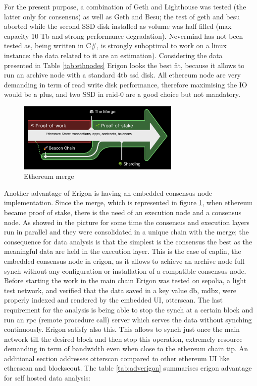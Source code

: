 \documentclass[11pt,a4paper,titlepage]{scrartcl}
\begin{document}
For the present purpose, a combination of Geth and Lighthouse was tested  (the latter only for consensus) as well as  Geth and Besu; the test of geth and besu aborted while the  second SSD disk installed as volume was half filled (max capacity 10 Tb and strong performance degradation).  Nevermind has not been tested as, being written in C\#, is strongly suboptimal to work on a linux instance: the data related to it are an estimation).
Considering the data presented in Table \ref{tab:ethnodes} Erigon looks the best fit, because it allows to run an archive node with a standard 4tb ssd disk. All ethereum node are very demanding in term of read write disk performance, therefore maximising the IO would be a plus, and two SSD in raid-0 are a good choice but not mandatory. 
\begin{figure}[ht]
    \includegraphics[width=0.7\textwidth]{image/powpos.png}
    \caption{Ethereum merge}
    \label{fig:powpos}
\end{figure}

Another advantage of Erigon is having an embedded consensus node implementation. Since the merge, which is represented in figure \ref{fig:powpos}, when ethereum became proof of stake, there is the need of an execution node and a consensus node. As showed in the picture for some time the consensus and execution layers run in parallel and they were consolidated in a unique chain with the merge; the consequence  for data analysis is that  the simplest is the consensus the best as the meaningful data are held in the execution layer. This is the case of caplin, the embedded consensus node in erigon, as it allows to achieve an archive node full synch without any configuration or installation of a compatible consensus node.
Before starting the work in the main chain  Erigon was tested on sepolia, a light test network, and verified that the data saved in a key value db, mdbx, were properly indexed and rendered by the embedded UI, otterscan. The last requirement for the analysis is being able to stop the synch at a certain block and run an rpc (remote procedure call) server which serves the data without synching continuously. Erigon satisfy also this. This allows to synch just once the main network till the desired block and then stop this operation, extremely resource demanding in term of bandwidth even when close to the ethereum chain tip.
An additional section addresses otterscan compared to other ethereum UI like etherscan and blockscout.
The table \ref{tab:adverigon} summarises erigon advantage for self hosted data analysis:
\end{document}
